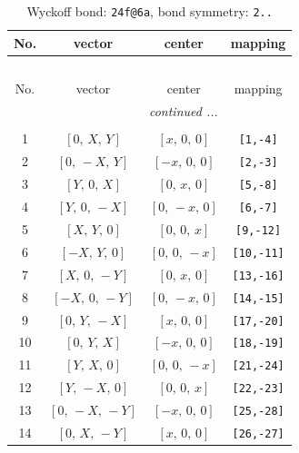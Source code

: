 \documentclass[fleqn,8pt]{jsarticle}
\begin{document}
\begin{longtable}{cccc}
\caption{Wyckoff bond: {\tt 24f@6a}, bond symmetry: {\tt 2..}}
 \\
 \hline \hline
No. & vector & center & mapping \\ \hline \endfirsthead

\multicolumn{3}{l}{\tablename\ \thetable{}} \\
 \hline \hline
No. & vector & center & mapping \\ \hline \endhead

 \hline \hline
\multicolumn{3}{r}{\footnotesize\it continued ...} \\ \endfoot

 \hline \hline
\multicolumn{3}{r}{} \\ \endlastfoot

1 & $\left[ 0,\, X,\, Y \right]$ & $\left[ x,\, 0,\, 0 \right]$ & {\tt [1,-4]} \\ \hline
2 & $\left[ 0,\, - X,\, Y \right]$ & $\left[ - x,\, 0,\, 0 \right]$ & {\tt [2,-3]} \\ \hline
3 & $\left[ Y,\, 0,\, X \right]$ & $\left[ 0,\, x,\, 0 \right]$ & {\tt [5,-8]} \\ \hline
4 & $\left[ Y,\, 0,\, - X \right]$ & $\left[ 0,\, - x,\, 0 \right]$ & {\tt [6,-7]} \\ \hline
5 & $\left[ X,\, Y,\, 0 \right]$ & $\left[ 0,\, 0,\, x \right]$ & {\tt [9,-12]} \\ \hline
6 & $\left[ - X,\, Y,\, 0 \right]$ & $\left[ 0,\, 0,\, - x \right]$ & {\tt [10,-11]} \\ \hline
7 & $\left[ X,\, 0,\, - Y \right]$ & $\left[ 0,\, x,\, 0 \right]$ & {\tt [13,-16]} \\ \hline
8 & $\left[ - X,\, 0,\, - Y \right]$ & $\left[ 0,\, - x,\, 0 \right]$ & {\tt [14,-15]} \\ \hline
9 & $\left[ 0,\, Y,\, - X \right]$ & $\left[ x,\, 0,\, 0 \right]$ & {\tt [17,-20]} \\ \hline
10 & $\left[ 0,\, Y,\, X \right]$ & $\left[ - x,\, 0,\, 0 \right]$ & {\tt [18,-19]} \\ \hline
11 & $\left[ Y,\, X,\, 0 \right]$ & $\left[ 0,\, 0,\, - x \right]$ & {\tt [21,-24]} \\ \hline
12 & $\left[ Y,\, - X,\, 0 \right]$ & $\left[ 0,\, 0,\, x \right]$ & {\tt [22,-23]} \\ \hline
13 & $\left[ 0,\, - X,\, - Y \right]$ & $\left[ - x,\, 0,\, 0 \right]$ & {\tt [25,-28]} \\ \hline
14 & $\left[ 0,\, X,\, - Y \right]$ & $\left[ x,\, 0,\, 0 \right]$ & {\tt [26,-27]} \\ \hline

\end{longtable}
\end{document}
